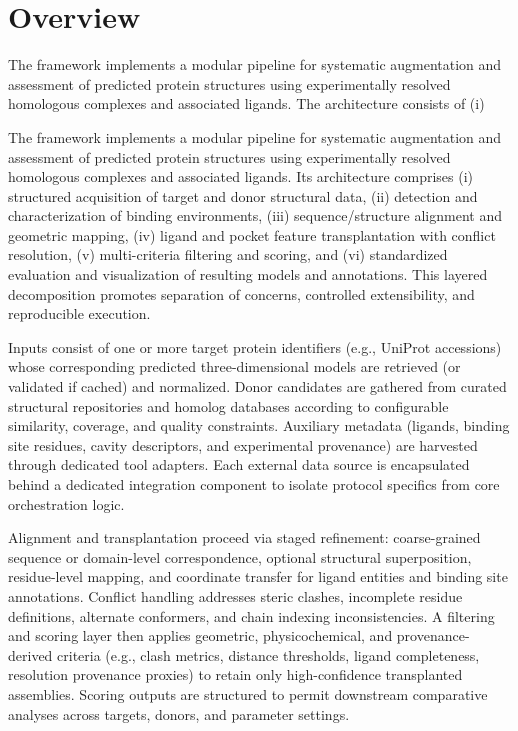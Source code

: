 \label{chap:methods}

\section{Overview}
The framework implements a modular pipeline for systematic augmentation and assessment of predicted protein structures using experimentally resolved homologous complexes and associated ligands. The architecture consists of (i)

The framework implements a modular pipeline for systematic augmentation and assessment of predicted protein structures using experimentally resolved homologous complexes and associated ligands. Its architecture comprises (i) structured acquisition of target and donor structural data, (ii) detection and characterization of binding environments, (iii) sequence/structure alignment and geometric mapping, (iv) ligand and pocket feature transplantation with conflict resolution, (v) multi-criteria filtering and scoring, and (vi) standardized evaluation and visualization of resulting models and annotations. This layered decomposition promotes separation of concerns, controlled extensibility, and reproducible execution.

Inputs consist of one or more target protein identifiers (e.g., UniProt accessions) whose corresponding predicted three-dimensional models are retrieved (or validated if cached) and normalized. Donor candidates are gathered from curated structural repositories and homolog databases according to configurable similarity, coverage, and quality constraints. Auxiliary metadata (ligands, binding site residues, cavity descriptors, and experimental provenance) are harvested through dedicated tool adapters. Each external data source is encapsulated behind a dedicated integration component to isolate protocol specifics from core orchestration logic.

Alignment and transplantation proceed via staged refinement: coarse-grained sequence or domain-level correspondence, optional structural superposition, residue-level mapping, and coordinate transfer for ligand entities and binding site annotations. Conflict handling addresses steric clashes, incomplete residue definitions, alternate conformers, and chain indexing inconsistencies. A filtering and scoring layer then applies geometric, physicochemical, and provenance-derived criteria (e.g., clash metrics, distance thresholds, ligand completeness, resolution provenance proxies) to retain only high-confidence transplanted assemblies. Scoring outputs are structured to permit downstream comparative analyses across targets, donors, and parameter settings.

